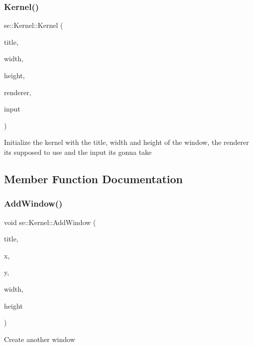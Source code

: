 \subsubsection{\texorpdfstring{Kernel()}{Kernel()}}
{\footnotesize\ttfamily se\+::\+Kernel\+::\+Kernel (\begin{DoxyParamCaption}\item[{const std\+::string \&}]{title,  }\item[{int}]{width,  }\item[{int}]{height,  }\item[{\mbox{\hyperlink{classse_1_1_abstract_renderer}{Abstract\+Renderer}} $\ast$}]{renderer,  }\item[{\mbox{\hyperlink{classse_1_1_input}{Input}} $\ast$}]{input }\end{DoxyParamCaption})}

Initialize the kernel with the title, width and height of the window, the renderer it\textquotesingle{}s supposed to use and the input it\textquotesingle{}s gonna take 

\subsection{Member Function Documentation}
\mbox{\label{classse_1_1_kernel_aa65f624076feaa97a95901077df35357}} 
\subsubsection{\texorpdfstring{Add\+Window()}{AddWindow()}}
{\footnotesize\ttfamily void se\+::\+Kernel\+::\+Add\+Window (\begin{DoxyParamCaption}\item[{const std\+::string \&}]{title,  }\item[{int}]{x,  }\item[{int}]{y,  }\item[{int}]{width,  }\item[{int}]{height }\end{DoxyParamCaption})}

Create another window \mbox{\label{classse_1_1_kernel_a1faeac6fce02ccd7ff76d94ad78e0754}} 
